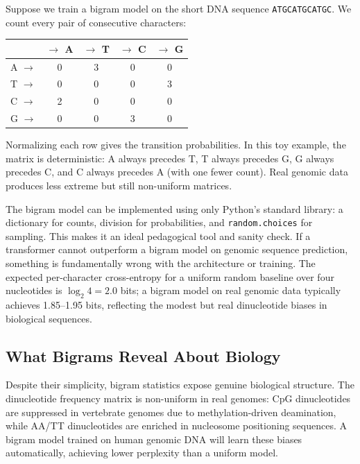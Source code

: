 \begin{example}
Suppose we train a bigram model on the short DNA sequence \texttt{ATGCATGCATGC}. We count every pair of consecutive characters:

\begin{center}
\begin{tabular}{lcccc}
\toprule
& $\to$ A & $\to$ T & $\to$ C & $\to$ G \\
\midrule
A $\to$ & 0 & 3 & 0 & 0 \\
T $\to$ & 0 & 0 & 0 & 3 \\
C $\to$ & 2 & 0 & 0 & 0 \\
G $\to$ & 0 & 0 & 3 & 0 \\
\bottomrule
\end{tabular}
\end{center}

\noindent
Normalizing each row gives the transition probabilities. In this toy example, the matrix is deterministic: A always precedes T, T always precedes G, G always precedes C, and C always precedes A (with one fewer count). Real genomic data produces less extreme but still non-uniform matrices.
\end{example}

\begin{implnote}
The bigram model can be implemented using only Python's standard library: a dictionary for counts, division for probabilities, and \texttt{random.choices} for sampling. This makes it an ideal pedagogical tool and sanity check. If a transformer cannot outperform a bigram model on genomic sequence prediction, something is fundamentally wrong with the architecture or training. The expected per-character cross-entropy for a uniform random baseline over four nucleotides is $\log_2 4 = 2.0$ bits; a bigram model on real genomic data typically achieves 1.85--1.95 bits, reflecting the modest but real dinucleotide biases in biological sequences.
\end{implnote}

\subsection{What Bigrams Reveal About Biology}

Despite their simplicity, bigram statistics expose genuine biological structure. The dinucleotide frequency matrix is non-uniform in real genomes: CpG dinucleotides are suppressed in vertebrate genomes due to methylation-driven deamination, while AA/TT dinucleotides are enriched in nucleosome positioning sequences. A bigram model trained on human genomic DNA will learn these biases automatically, achieving lower perplexity than a uniform model.

